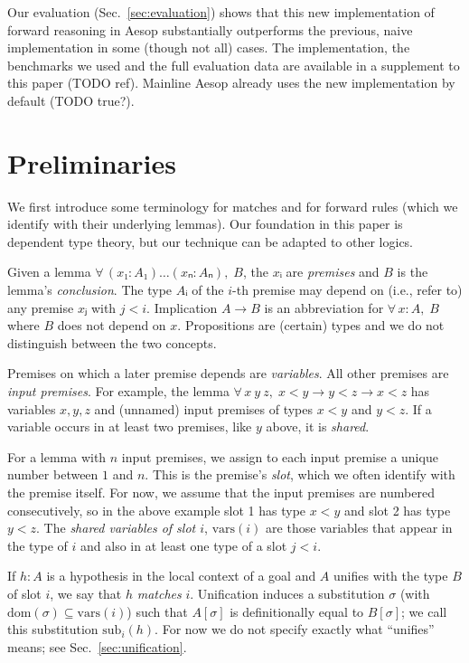 \documentclass[runningheads]{llncs}
\newcommand{\All}[2]{\ensuremath{\forall\, #1,\; #2}}
\newcommand{\vars}{\ensuremath{\mathrm{vars}}}
\newcommand{\dom}{\ensuremath{\mathrm{dom}}}
\newcommand{\sub}{\ensuremath{\mathrm{sub}}}
\begin{document}
Our evaluation (Sec.~\ref{sec:evaluation}) shows that this new implementation of forward reasoning in Aesop substantially outperforms the previous, naive implementation in some (though not all) cases.
The implementation, the benchmarks we used and the full evaluation data are available in a supplement to this paper (TODO ref).
Mainline Aesop already uses the new implementation by default (TODO true?).

\section{Preliminaries}

We first introduce some terminology for matches and for forward rules (which we identify with their underlying lemmas).
Our foundation in this paper is dependent type theory, but our technique can be adapted to other logics.

Given a lemma $\All{(x₁ : A₁) \dots (xₙ : Aₙ)}{B}$, the $xᵢ$ are \emph{premises} and $B$ is the lemma's \emph{conclusion}.
The type $Aᵢ$ of the $i$-th premise may depend on (i.e., refer to) any premise $xⱼ$ with $j < i$.
Implication $A → B$ is an abbreviation for $\All{x : A}{B}$ where $B$ does not depend on $x$.
Propositions are (certain) types and we do not distinguish between the two concepts.

Premises on which a later premise depends are \emph{variables}.
All other premises are \emph{input premises}.
For example, the lemma $\All{x~y~z}{x < y → y < z → x < z}$ has variables $x, y, z$ and (unnamed) input premises of types $x < y$ and $y < z$.
If a variable occurs in at least two premises, like $y$ above, it is \emph{shared}.

For a lemma with $n$ input premises, we assign to each input premise a unique number between $1$ and $n$.
This is the premise's \emph{slot}, which we often identify with the premise itself.
For now, we assume that the input premises are numbered consecutively, so in the above example slot 1 has type $x < y$ and slot 2 has type $y < z$.
The \emph{shared variables of slot $i$}, $\vars(i)$ are those variables that appear in the type of $i$ and also in at least one type of a slot $j < i$.

If $h : A$ is a hypothesis in the local context of a goal and $A$ unifies with the type $B$ of slot $i$, we say that $h$ \emph{matches} $i$.
Unification induces a substitution $σ$ (with $\dom(σ) ⊆ \vars(i)$) such that $A[σ]$ is definitionally equal to $B[σ]$; we call this substitution $\sub_{i}(h)$.
For now we do not specify exactly what \enquote{unifies} means; see Sec.~\ref{sec:unification}.
\end{document}
